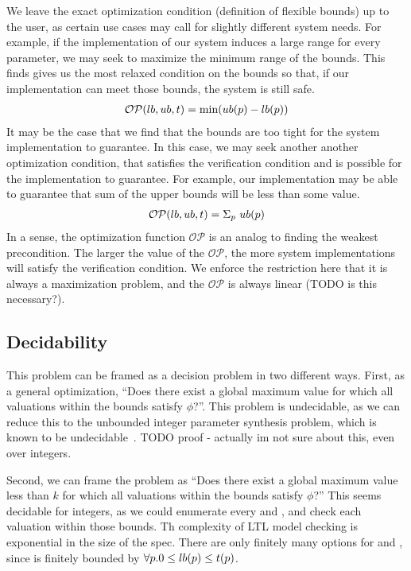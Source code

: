 We leave the exact optimization condition (definition of flexible bounds) up to the user, as certain use cases may call for slightly different system needs.
For example, if the implementation of our system induces a large range for every parameter, we may seek to maximize the minimum range of the bounds.
This finds gives us the most relaxed condition on the bounds so that, if our implementation can meet those bounds, the system is still safe.
%
\begin{align*}
	\mathcal{OP}(lb,ub,t) = \text{min}(ub(p) - lb(p))
\end{align*}
%
It may be the case that we find that the bounds are too tight for the system implementation to guarantee. 
In this case, we may seek another another optimization condition, that satisfies the verification condition and is possible for the implementation to guarantee.
For example, our implementation may be able to guarantee that sum of the upper bounds will be less than some value.
\begin{align*}
\mathcal{OP}(lb,ub,t) = \Sigma_{p} \ ub(p)
\end{align*}
%
In a sense, the optimization function $\mathcal{OP}$ is an analog to finding the weakest precondition.
The larger the value of the $\mathcal{OP}$, the more system implementations will satisfy the verification condition.
We enforce the restriction here that it is always a maximization problem, and the $\mathcal{OP}$ is always linear (TODO is this necessary?).

\subsection{Decidability}

This problem can be framed as a decision problem in two different ways.
First, as a general optimization, ``Does there exist a global maximum value for which all valuations within the bounds satisfy $\phi$?''.
This problem is undecidable, as we can reduce this to the unbounded integer parameter synthesis problem, which is known to be undecidable~\cite{benevs2015language}.
TODO proof - actually im not sure about this, even over integers.

Second, we can frame the problem as ``Does there exist a global maximum value less than $k$ for which all valuations within the bounds satisfy $\phi$?''
This seems decidable for integers, as we could enumerate every \lowerB and \upperB, and check each valuation within those bounds.
Th complexity of LTL model checking is exponential in the size of the spec.
There are only finitely many options for \lowerB and \upperB, since \lowerB is finitely bounded by $\forall p. 0 \leq lb(p) \leq t(p)$.




